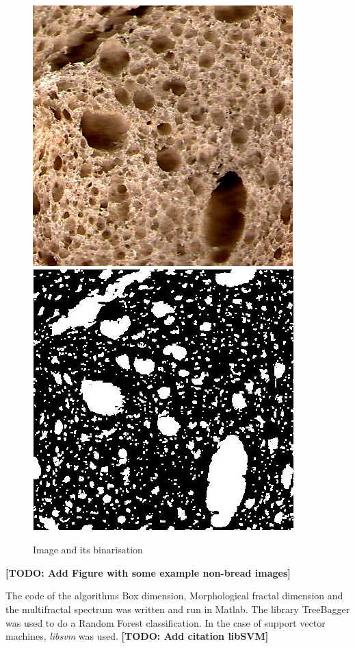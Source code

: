 \documentclass[oneside,a4paper,english,links]{amca}
\newcommand{\todo}[1]{\textbf{[TODO: #1]}}
\begin{document}
\begin{figure}[htb]
\centering
\includegraphics[scale=1.3]{imagenes/baguette20}
\includegraphics[scale=0.265]{imagenes/baguette20bin}
\caption{Image and its binarisation}
\label{fig:binarizacion}
\end{figure}

\todo{Add Figure with some example non-bread images}

The code of the algorithms Box dimension, Morphological fractal dimension and the multifractal spectrum was written and run in Matlab. The library TreeBagger was used to do a Random Forest classification. In the case of support vector machines, {\em libsvm} was used. \todo{Add citation libSVM}
\end{document}
